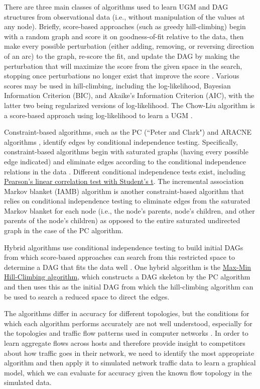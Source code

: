 \documentclass[conference]{IEEEtran}
\begin{document}
There are three main classes of algorithms used to learn UGM and DAG structures from observational data (i.e., without manipulation of the values at any node). Briefly, score-based approaches (such as greedy hill-climbing) begin with a random graph and score it on goodness-of-fit relative to the data, then make every possible perturbation (either adding, removing, or reversing direction of an arc) to the graph, re-score the fit, and update the DAG by making the perturbation that will maximize the score from the given space in the search, stopping once perturbations no longer exist that improve the score \cite{b9}. Various scores may be used in hill-climbing, including the log-likelihood, Bayesian Information Criterion (BIC), and Akaike's Information Criterion (AIC), with the latter two being regularized versions of log-likelihood. The Chow-Liu algorithm is a score-based approach using log-likelihood to learn a UGM \cite{b10}.

Constraint-based algorithms, such as the PC (``Peter and Clark") and ARACNE algorithms \cite{b11}, identify edges by conditional independence testing. Specifically, constraint-based algorithms begin with saturated graphs (having every possible edge indicated) and eliminate edges according to the conditional independence relations in the data \cite{b9}. Different conditional independence tests exist, including \href{http://www.bnlearn.com/documentation/man/conditional.independence.tests.html}{Pearson's linear correlation test with Student's t}. The incremental association Markov blanket (IAMB) algorithm is another constraint-based algorithm \cite{b12} that relies on conditional independence testing to eliminate edges from the saturated Markov blanket for each node (i.e., the node's parents, node's children, and other parents of the node's children) as opposed to the entire saturated undirected graph in the case of the PC algorithm.

Hybrid algorithms use conditional independence testing to build initial DAGs from which score-based approaches can search from this restricted space to determine a DAG that fits the data well \cite{b9}. One hybrid algorithm is the  \href{https://link.springer.com/article/10.1007/s10994-006-6889-7}{Max-Min Hill-Climbing algorithm}, which constructs a DAG skeleton by the PC algorithm and then uses this as the initial DAG from which the hill-climbing algorithm can be used to search a reduced space to direct the edges.

The algorithms differ in accuracy for different topologies, but the conditions for which each algorithm performs accurately are not well understood, especially for the topologies and traffic flow patterns used in computer networks \cite{b13}. In order to learn aggregate flows across hosts and therefore provide insight to competitors about how traffic goes in their network, we need to identify the most appropriate algorithm and then apply it to simulated network traffic data to learn a graphical model, which we can evaluate for accuracy given the known flow topology in the simulated data.
\end{document}
